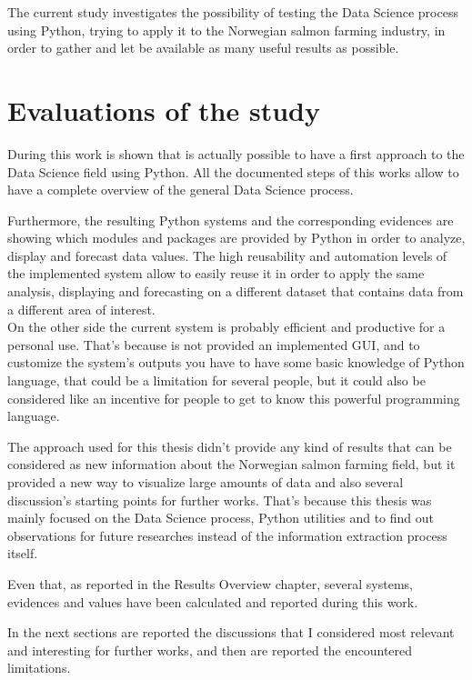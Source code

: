 
The current study investigates the possibility of testing the Data Science process using Python, trying to apply it to the Norwegian salmon farming industry, in order to gather and let be available as many useful results as possible.

\section{Evaluations of the study}
During this work is shown that is actually possible to have a first approach to the Data Science field using Python. All the documented steps of this works allow to have a complete overview of the general Data Science process.

Furthermore, the resulting Python systems and the corresponding evidences are showing which modules and packages are provided by Python in order to analyze, display and forecast data values. The high reusability and automation levels of the implemented system allow to easily reuse it in order to apply the same analysis, displaying and forecasting on a different dataset that contains data from a different area of interest. \\
On the other side the current system is probably efficient and productive for a personal use. That's because is not provided an implemented GUI, and to customize the system's outputs you have to have some basic knowledge of Python language, that could be a limitation for several people, but it could also be considered like an incentive for people to get to know this powerful programming language.

The approach used for this thesis didn't provide any kind of results that can be considered as new information about the Norwegian salmon farming field, but it provided a new way to visualize large amounts of data and also several discussion's starting points for further works. That's because this thesis was mainly focused on the Data Science process, Python utilities and to find out observations for future researches instead of the information extraction process itself.

Even that, as reported in the Results Overview chapter, several systems, evidences and values have been calculated and reported during this work. 

In the next sections are reported the discussions that I considered most relevant and interesting for further works, and then are reported the encountered limitations. 

